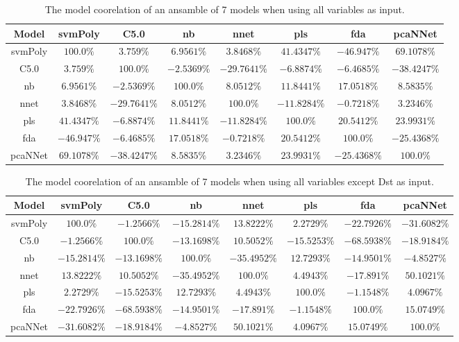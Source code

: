 \begin{table}[!ht]
	\centering
	\begin{tabular}{|c|c|c|c|c|c|c|c|}
		\hline
		Model & svmPoly & C5.0 & nb & nnet & pls & fda & pcaNNet \\ \hline
		svmPoly & $100.0\%$ & $3.759\%$ & $6.9561\%$ & $3.8468\%$ & $41.4347\%$ & $-46.947\%$ & $69.1078\%$ \\ \hline
		C5.0 & $3.759\%$ & $100.0\%$ & $-2.5369\%$ & $-29.7641\%$ & $-6.8874\%$ & $-6.4685\%$ & $-38.4247\%$ \\ \hline
		nb & $6.9561\%$ & $-2.5369\%$ & $100.0\%$ & $8.0512\%$ & $11.8441\%$ & $17.0518\%$ & $8.5835\%$ \\ \hline
		nnet & $3.8468\%$ & $-29.7641\%$ & $8.0512\%$ & $100.0\%$ & $-11.8284\%$ & $-0.7218\%$ & $3.2346\%$ \\ \hline
		pls & $41.4347\%$ & $-6.8874\%$ & $11.8441\%$ & $-11.8284\%$ & $100.0\%$ & $20.5412\%$ & $23.9931\%$ \\ \hline
		fda & $-46.947\%$ & $-6.4685\%$ & $17.0518\%$ & $-0.7218\%$ & $20.5412\%$ & $100.0\%$ & $-25.4368\%$ \\ \hline
		pcaNNet & $69.1078\%$ & $-38.4247\%$ & $8.5835\%$ & $3.2346\%$ & $23.9931\%$ & $-25.4368\%$ & $100.0\%$ \\ \hline
	\end{tabular}
	\caption{The model coorelation of an ansamble of 7 models when using all variables as input.}
	\label{tab:ansamble7:all}
\end{table}

\begin{table}[!ht]
	\centering
	\begin{tabular}{|c|c|c|c|c|c|c|c|}
		\hline
		Model & svmPoly & C5.0 & nb & nnet & pls & fda & pcaNNet \\ \hline
		svmPoly & $100.0\%$ & $-1.2566\%$ & $-15.2814\%$ & $13.8222\%$ & $2.2729\%$ & $-22.7926\%$ & $-31.6082\%$ \\ \hline
		C5.0 & $-1.2566\%$ & $100.0\%$ & $-13.1698\%$ & $10.5052\%$ & $-15.5253\%$ & $-68.5938\%$ & $-18.9184\%$ \\ \hline
		nb & $-15.2814\%$ & $-13.1698\%$ & $100.0\%$ & $-35.4952\%$ & $12.7293\%$ & $-14.9501\%$ & $-4.8527\%$ \\ \hline
		nnet & $13.8222\%$ & $10.5052\%$ & $-35.4952\%$ & $100.0\%$ & $4.4943\%$ & $-17.891\%$ & $50.1021\%$ \\ \hline
		pls & $2.2729\%$ & $-15.5253\%$ & $12.7293\%$ & $4.4943\%$ & $100.0\%$ & $-1.1548\%$ & $4.0967\%$ \\ \hline
		fda & $-22.7926\%$ & $-68.5938\%$ & $-14.9501\%$ & $-17.891\%$ & $-1.1548\%$ & $100.0\%$ & $15.0749\%$ \\ \hline
		pcaNNet & $-31.6082\%$ & $-18.9184\%$ & $-4.8527\%$ & $50.1021\%$ & $4.0967\%$ & $15.0749\%$ & $100.0\%$ \\ \hline
	\end{tabular}
	\caption{The model coorelation of an ansamble of 7 models when using all variables except Dst as input.}
	\label{tab:ansamble7:noDst}
\end{table}

